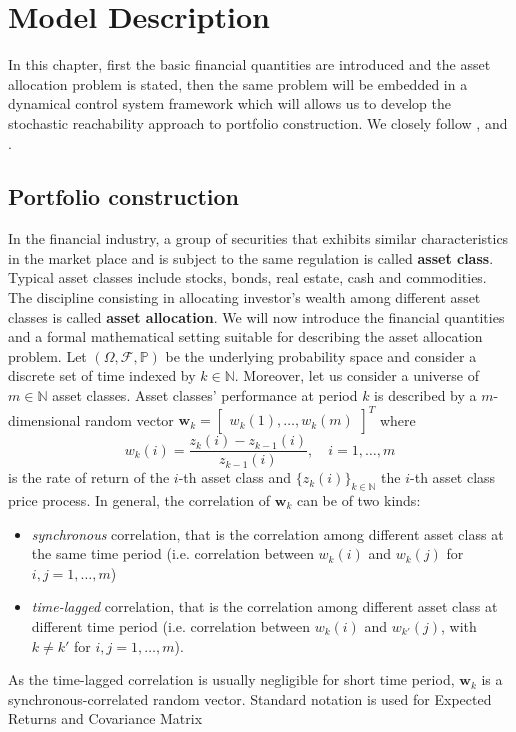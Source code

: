 \chapter{Model Description}\label{chpt:Model_Description}
In this chapter, first the basic financial quantities are introduced and the asset allocation problem is stated, then the same problem will be embedded in a dynamical control system framework which will allows us to develop the stochastic reachability approach to portfolio construction. We closely follow \cite{Pola12},\cite{Pola06} and \cite{Pola}.
\section{Portfolio construction}
In the financial industry, a group of securities that exhibits similar characteristics in the market place and is subject to the same regulation is called \textbf{asset class}. Typical asset classes include stocks, bonds, real estate, cash and commodities. The discipline consisting in allocating investor's wealth among different asset classes is called \textbf{asset allocation}. We will now introduce the financial quantities and a formal mathematical setting suitable for describing the asset allocation problem. Let $(\Omega,\mathcal{F},\mathbb{P})$ be the underlying  probability space and consider a discrete set of time indexed by $k \in \mathbb{N}$. Moreover, let us consider a universe of $m \in \mathbb{N}$ asset classes. Asset classes' performance at period $k$ is described by a $m$-dimensional random vector 
$\bm{w}_k = \begin{bmatrix} w_k(1),\ldots,w_k(m)\end{bmatrix}^T $ 
where 
$$ w_k(i) = \frac{z_k(i)-z_{k-1}(i)}{z_{k-1}(i)}, \quad i = 1,\ldots,m$$
is the rate of return of the $i$-th asset class and $\{z_k(i)\}_{k \in \mathbb{N}}$ the $i$-th asset class price process. In general, the correlation of $\bm{w}_k$ can be of two kinds:
\begin{itemize}
	\item \textit{synchronous} correlation, that is the correlation among different asset class at the same time period (i.e. correlation between $w_k(i)$ and $w_k(j)$ for $i,j=1,\ldots,m$)
	\item \textit{time-lagged} correlation, that is the correlation among different asset class at different time period (i.e. correlation between $w_k(i)$ and $w_{k'}(j)$, with $k\neq k'$ for $i,j=1,\ldots,m$).
\end{itemize}
As the time-lagged correlation is usually negligible for short time period, $\bm{w}_k$ is a synchronous-correlated random vector. Standard notation is used for Expected Returns and Covariance Matrix 

